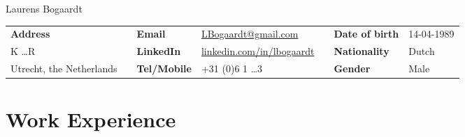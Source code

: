 \documentclass[a4paper,9pt]{extarticle}
\begin{document}
\begin{bf}
\begin{center}
\begin{Huge}
Laurens Bogaardt
\end{Huge}
\end{center}
\end{bf}

\vspace{3mm}

\begin{center}
\setlength{\tabcolsep}{0mm}
\begin{tabular}{p{}p{}p{}p{}<{\raggedleft}p{}p{}p{}<{\raggedleft}}
\textbf{Address}&&\textbf{Email}&\href{mailto:lbogaardt@gmail.com}{LBogaardt@gmail.com}&&\textbf{Date of birth}&14-04-1989\\
K \ldots R &&\textbf{LinkedIn}&\href{https://www.linkedin.com/in/lbogaardt}{linkedin.com/in/lbogaardt}&&\textbf{Nationality}&Dutch\\
Utrecht, the Netherlands&&\textbf{Tel/Mobile}&+31 (0)6 1 \ldots 3 &&\textbf{Gender}&Male
\end{tabular}
\end{center}

\vspace{5mm}

\section*{Work Experience}
\end{document}

